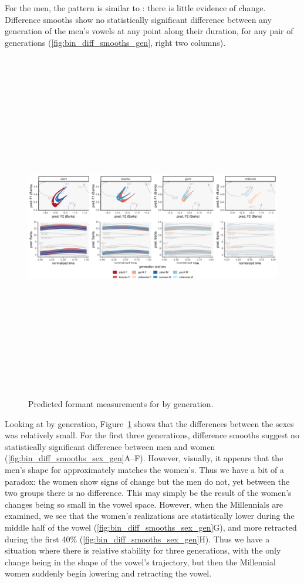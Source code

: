 For the men, the pattern is similar to \bit: there is little evidence of change. Difference smooths show no statistically significant difference between any generation of the men's vowels at any point along their duration, for any pair of generations (\ref{fig:bin_diff_smooths_gen}, right two columns).

\begin{figure}[p]
	\centering
	\includegraphics[angle = 90, origin = c, height = 6in]{Figures/BIN/BIN_sex_panel_plot_wide.pdf}
	\caption[Predicted formant measurements for \bin by generation.]{Predicted formant measurements for \bin by generation.}
	\label{fig:BIN_sex_panel_plot_wide}
\end{figure}

Looking at \bin by generation, Figure~\ref{fig:BIN_sex_panel_plot_wide} shows that the differences between the sexes was relatively small. For the first three generations, difference smooths suggest no statistically significant difference between men and women (\ref{fig:bin_diff_smooths_sex_gen}A--F). However, visually, it appears that the men's shape for \bin approximately matches the women's. Thus we have a bit of a paradox: the women show signs of change but the men do not, yet between the two groups there is no difference. This may simply be the result of the women's changes being so small in the vowel space. However, when the Millennials are examined, we see that the women's realizations are statistically lower during the middle half of the vowel (\ref{fig:bin_diff_smooths_sex_gen}G), and more retracted during the first 40\% (\ref{fig:bin_diff_smooths_sex_gen}H). Thus we have a situation where there is relative stability for three generations, with the only change being in the shape of the vowel's trajectory, but then the Millennial women suddenly begin lowering and retracting the vowel.

